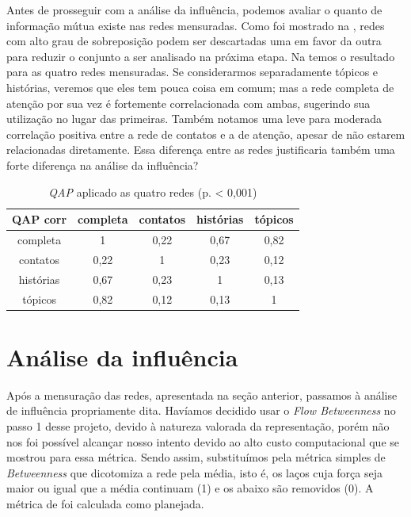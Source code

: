 Antes de prosseguir com a análise da influência, podemos avaliar o quanto de
informação mútua existe nas redes mensuradas. Como foi mostrado na
, redes com alto grau de sobreposição podem ser
descartadas uma em favor da outra para reduzir o conjunto a ser analisado na
próxima etapa. Na  temos o resultado para as quatro redes
mensuradas. Se considerarmos separadamente tópicos e histórias, veremos que eles
tem pouca coisa em comum; mas a rede completa de atenção por sua vez é
fortemente correlacionada com ambas, sugerindo sua utilização no lugar das
primeiras. Também notamos uma leve para moderada correlação positiva entre a
rede de contatos e a de atenção, apesar de não estarem relacionadas diretamente.
Essa diferença entre as redes justificaria também uma forte diferença na análise
da influência?

\begin{table}[htbp]
	\setlength{\arrayrulewidth}{2\arrayrulewidth}
	\setlength{\belowcaptionskip}{10pt}
	\caption{\emph{QAP} aplicado as quatro redes (p. < 0,001)} \centering
	\begin{tabular}{|c | c  c  c  c |}
	\hline
	QAP corr & completa & contatos & histórias & tópicos \\ \hline
	completa & 1 & 0,22 & 0,67 & 0,82 \\
	contatos & 0,22 & 1 & 0,23 & 0,12 \\
	histórias & 0,67 & 0,23 & 1 & 0,13 \\
	tópicos	& 0,82 & 0,12 & 0,13 & 1 \\ \hline
	\end{tabular}
	\label{ap:tab:qap}
\end{table}


\section{Análise da influência}
\label{ap:sec:analise}

Após a mensuração das redes, apresentada na seção anterior, passamos à análise
de influência propriamente dita. Havíamos decidido usar o \emph{Flow
Betweenness} no passo 1 desse projeto, devido à natureza valorada da
representação, porém não nos foi possível alcançar nosso intento devido ao alto
custo computacional que se mostrou para essa métrica. Sendo assim, substituímos
pela métrica simples de \emph{Betweenness} que dicotomiza a rede pela média,
isto é, os laços cuja força seja maior ou igual que a média continuam (1) e os
abaixo são removidos (0). A métrica de \citeauthor{Bonacich1987} foi calculada
como planejada.

